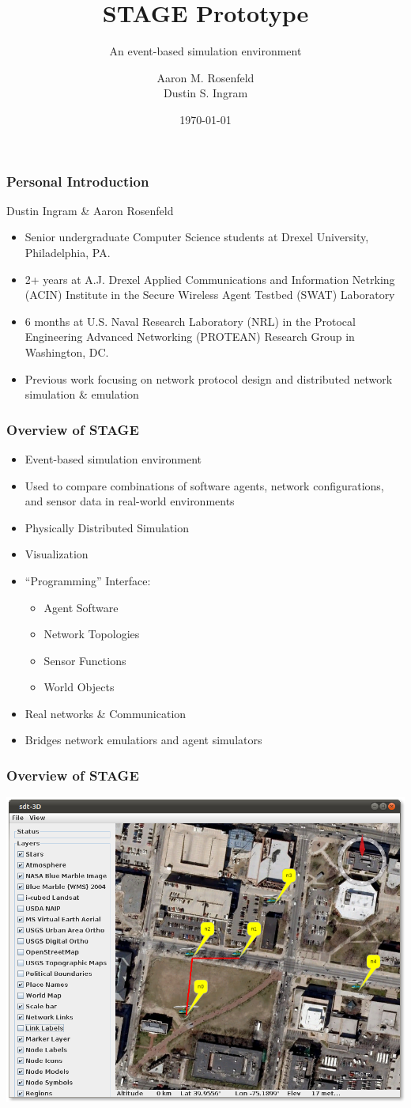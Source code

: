 \documentclass[mathserif]{beamer}
\title{STAGE Prototype}
\subtitle{An event-based simulation environment}
\author{Aaron M. Rosenfeld \\ Dustin S. Ingram}
\date{\today}
\begin{document}
\frame{\titlepage}

\frame
{
    \frametitle{Personal Introduction}
    Dustin Ingram \& Aaron Rosenfeld
    \begin{itemize}
	\item Senior undergraduate Computer Science students at Drexel University, Philadelphia, PA.
	\item 2+ years at A.J. Drexel Applied Communications and Information Netrking (ACIN) Institute in the Secure Wireless Agent Testbed (SWAT) Laboratory
	\item 6 months at U.S. Naval Research Laboratory (NRL) in the Protocal Engineering Advanced Networking (PROTEAN) Research Group in Washington, DC.
	\item Previous work focusing on network protocol design and distributed network simulation \& emulation
    \end{itemize}
}

\frame
{
    \frametitle{Overview of STAGE}
    \begin{itemize}
	\item Event-based simulation environment
	\item Used to compare combinations of software agents, network configurations, and sensor data in real-world environments
	\item Physically Distributed Simulation
	\item Visualization
	\item ``Programming'' Interface:
	\begin{itemize}
	    \item Agent Software
	    \item Network Topologies
	    \item Sensor Functions
	    \item World Objects
	\end{itemize}
	\item Real networks \& Communication
	\item Bridges network emulatiors and agent simulators
    \end{itemize}
}

\frame
{
    \frametitle{Overview of STAGE}
    \begin{center}
        \includegraphics{ss2.png}
    \end{center}
}
\end{document}
